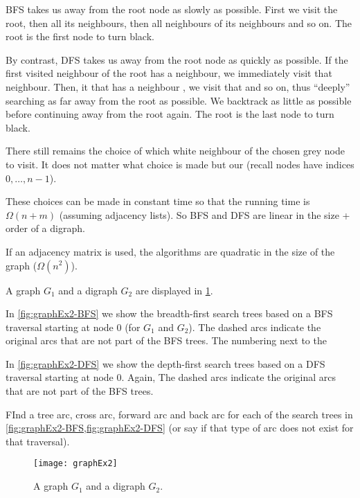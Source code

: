 BFS takes us away
from the root node as slowly as possible. First we visit the root, then all its neighbours, then all neighbours of its neighbours and so on. The root is the first node to turn black.

By contrast, DFS  takes us away
from the root node as quickly as possible. If the first visited neighbour of the root has a neighbour, we immediately visit that neighbour. Then, it that has a neighbour , we visit that and so on, thus ``deeply''
searching as far away from the root as possible. We backtrack as little as possible before continuing away from the root again. The root is the last node to turn black.

There still remains the choice
of which white neighbour of the chosen grey node to visit. It does
not matter what choice is made but our  (recall nodes have indices $0, \dots, n - 1$). 

These choices can be made in constant time so that the running time is  $\Omega(n + m)$ (assuming adjacency lists). So BFS and DFS are linear in the size + order of a digraph. 

If an adjacency matrix is used, the algorithms are quadratic in the size of the graph ($\Omega(n^2)$).

\begin{Example}
\label{eg:graphExample2}

A graph $G_1$ and a digraph $G_2$ are displayed in
\cref{fig:graphExample2}.

In \cref{fig:graphEx2-BFS} we show the breadth-first search trees based on a BFS traversal starting at node $0$ (for $G_1$ and $G_2$). The
dashed arcs indicate the original arcs that are not part of the BFS trees. The numbering next to the 

In \cref{fig:graphEx2-DFS} we show the depth-first search trees based on a DFS traversal starting at node $0$. Again, The
dashed arcs indicate the original arcs that are not part of the BFS trees.


\begin{Boxample}[2]
FInd a tree arc, cross arc, forward arc and back arc for each of the search trees in \cref{fig:graphEx2-BFS,fig:graphEx2-DFS} (or say if that type of arc does not exist for that traversal).
\end{Boxample}

\end{Example}
\begin{figure}[hbtp]
	\centering
	\texttt{[image: graphEx2]}
	\caption{A graph $G_1$ and a digraph $G_2$.}
	\label{fig:graphExample2}
\end{figure}

